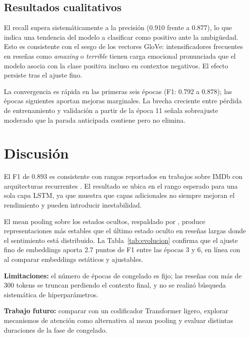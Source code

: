 \documentclass[letterpaper, 10pt, conference]{ieeeconf}
\begin{document}
\subsection{Resultados cualitativos}

El recall supera sistem\'aticamente a la precisi\'on (0.910 frente a 0.877),
lo que indica una tendencia del modelo a clasificar como positivo ante la
ambig\"uedad. Esto es consistente con el sesgo de los vectores GloVe:
intensificadores frecuentes en rese\~nas como \textit{amazing} o
\textit{terrible} tienen carga emocional pronunciada que el modelo asocia con
la clase positiva incluso en contextos negativos. El efecto persiste tras el
ajuste fino.

La convergencia es r\'apida en las primeras seis \'epocas (F1: 0.792 a 0.878);
las \'epocas siguientes aportan mejoras marginales. La brecha creciente entre
p\'erdida de entrenamiento y validaci\'on a partir de la \'epoca 11 se\~nala
sobreajuste moderado que la parada anticipada contiene pero no elimina.

\section{Discusi\'on}

El F1 de 0.893 es consistente con rangos reportados en trabajos sobre IMDb con
arquitecturas recurrentes \cite{howard2018}. El resultado se ubica en el rango
esperado para una sola capa LSTM, ya que \cite{greff2015} muestra que capas
adicionales no siempre mejoran el rendimiento y pueden introducir inestabilidad.

El mean pooling sobre los estados ocultos, respaldado por \cite{conneau2017},
produce representaciones m\'as estables que el \'ultimo estado oculto en
rese\~nas largas donde el sentimiento est\'a distribuido. La
Tabla~\ref{tab:evolucion} confirma que el ajuste fino de embeddings aporta 2.7
puntos de F1 entre las \'epocas 3 y 6, en l\'inea con \cite{kim2014} al
comparar embeddings est\'aticos y ajustables.

\textbf{Limitaciones:} el n\'umero de \'epocas de congelado es fijo; las
rese\~nas con m\'as de 300 tokens se truncan perdiendo el contexto final, y no
se realiz\'o b\'usqueda sistem\'atica de hiperpar\'ametros.

\textbf{Trabajo futuro:} comparar con un codificador Transformer ligero,
explorar mecanismos de atenci\'on como alternativa al mean pooling y evaluar
distintas duraciones de la fase de congelado.
\end{document}
